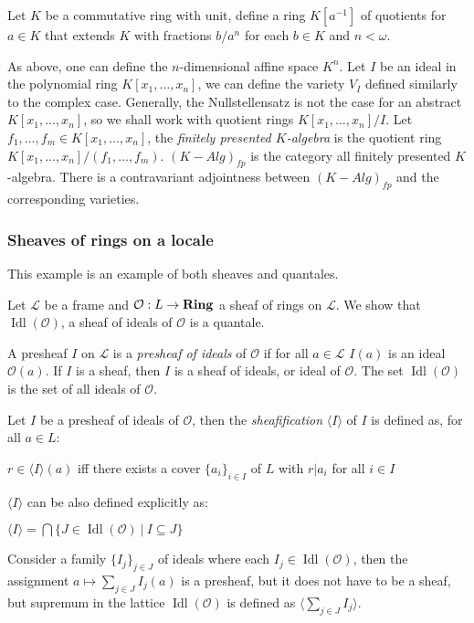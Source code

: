 \documentclass[a4paper]{article}
\theoremstyle{defin}
\theoremstyle{theorem}
\theoremstyle{claim}
\theoremstyle{prop}
\theoremstyle{lemma}
\theoremstyle{fact}
\theoremstyle{ex}
\theoremstyle{col}
\begin{document}
Let $K$ be a commutative ring with unit, define a ring $K[a^{-1}]$ of quotients for $a \in K$ that extends $K$ with fractions $b/a^n$ for each $b \in K$ and $n < \omega$.

As above, one can define the $n$-dimensional affine space $K^n$. Let $I$ be an ideal in the polynomial ring $K[x_1, \dots, x_n]$, we can define the variety $V_I$ defined similarly to the complex case. Generally, the Nullstellensatz is not the case for an abstract $K[x_1, \dots, x_n]$, so we shall work with quotient rings $K[x_1, \dots, x_n]/I$. Let $f_1, \dots, f_m \in K[x_1, \dots, x_n]$, the \emph{finitely presented $K$-algebra} is the quotient ring $K[x_1, \dots, x_n]/(f_1, \dots, f_m)$. $(K - Alg)_{fp}$ is the category all finitely presented $K$-algebra. There is a contravariant adjointness between $(K - Alg)_{fp}$ and the corresponding varieties.

\subsubsection{Sheaves of rings on a locale}

This example is an example of both sheaves and quantales.

Let $\mathcal{L}$ be a frame and $\mathcal{O} : L \to {\bf Ring}$ a sheaf of rings on $\mathcal{L}$. We show that $\operatorname{Idl}(\mathcal{O})$, a sheaf of ideals of $\mathcal{O}$ is a quantale.

A presheaf $I$ on $\mathcal{L}$ is a \emph{presheaf of ideals} of $\mathcal{O}$ if for all $a \in \mathcal{L}$
$I(a)$ is an ideal $\mathcal{O}(a)$. If $I$ is a sheaf, then $I$ is a sheaf of ideals, or ideal of $\mathcal{O}$. The set $\operatorname{Idl}(\mathcal{O})$ is the set of all ideals of $\mathcal{O}$.

Let $I$ be a presheaf of ideals of $\mathcal{O}$, then the \emph{sheafification} $\langle I \rangle$ of $I$ is defined as, for all $a \in L$:
\begin{center}
$r \in \langle I \rangle(a)$ iff there exists a cover $\{ a_i \}_{i \in I}$ of $L$ with $r|a_i$ for all $i \in I$
\end{center}

$\langle I \rangle$ can be also defined explicitly as:
\begin{center}
$\langle I \rangle = \bigcap \{ J \in \operatorname{Idl}(\mathcal{O}) \: | \: I \subseteq J \}$
\end{center}

Consider a family $\{ I_j \}_{j \in J}$ of ideals where each $I_j \in \operatorname{Idl}(\mathcal{O})$, then the assignment $a \mapsto \sum \limits_{j \in J} I_j(a)$ is a presheaf, but it does not have to be a sheaf, but supremum in the lattice $\operatorname{Idl}(\mathcal{O})$ is defined as $\langle \sum \limits_{j \in J} I_j \rangle$.
\end{document}
